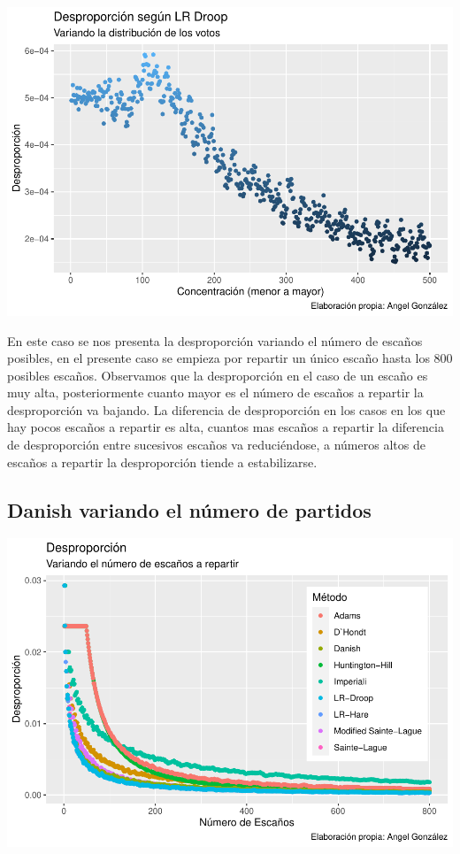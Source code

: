 \documentclass[12pt,a4paper,]{book}
\numberwithin{dummy}{section}
\theoremstyle{ocrenumbox}
\theoremstyle{blacknumex}
\theoremstyle{blacknumbox}
\theoremstyle{ocrenum}
\theoremstyle{ocrenum}
\begin{document}
\begin{center}\includegraphics[width=0.95\linewidth]{figurasR/unnamed-chunk-48-1} \end{center}

En este caso se nos presenta la desproporción variando el número de
escaños posibles, en el presente caso se empieza por repartir un único
escaño hasta los 800 posibles escaños. Observamos que la desproporción
en el caso de un escaño es muy alta, posteriormente cuanto mayor es el
número de escaños a repartir la desproporción va bajando. La diferencia
de desproporción en los casos en los que hay pocos escaños a repartir es
alta, cuantos mas escaños a repartir la diferencia de desproporción
entre sucesivos escaños va reduciéndose, a números altos de escaños a
repartir la desproporción tiende a estabilizarse.

\hypertarget{danish-variando-el-nuxfamero-de-partidos}{%
\subsection{Danish variando el número de
partidos}\label{danish-variando-el-nuxfamero-de-partidos}}

\begin{center}\includegraphics[width=0.95\linewidth]{figurasR/unnamed-chunk-49-1} \end{center}
\end{document}
